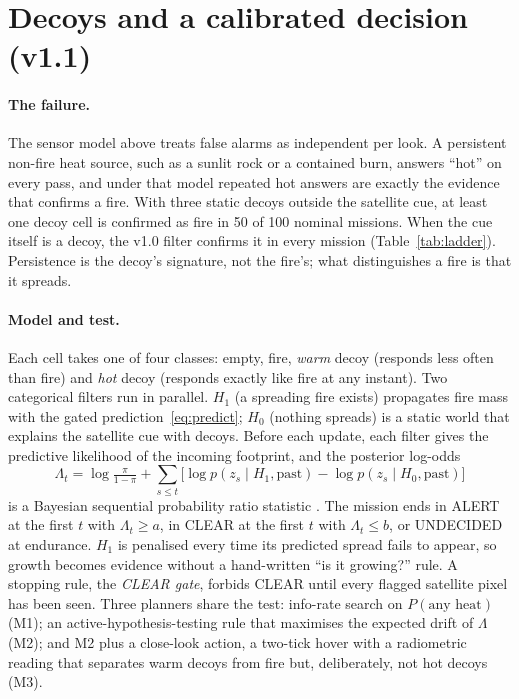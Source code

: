 \documentclass[10pt,a4paper]{article}
\begin{document}
\section{Decoys and a calibrated decision (v1.1)}\label{sec:v11}
\paragraph{The failure.} The sensor model above treats false alarms as independent per look. A persistent non-fire heat source, such as a sunlit rock or a contained burn, answers ``hot'' on every pass, and under that model repeated hot answers are exactly the evidence that confirms a fire. With three static decoys outside the satellite cue, at least one decoy cell is confirmed as fire in 50 of 100 nominal missions. When the cue itself is a decoy, the v1.0 filter confirms it in every mission (Table~\ref{tab:ladder}). Persistence is the decoy's signature, not the fire's; what distinguishes a fire is that it spreads.

\paragraph{Model and test.} Each cell takes one of four classes: empty, fire, \emph{warm} decoy (responds less often than fire) and \emph{hot} decoy (responds exactly like fire at any instant). Two categorical filters run in parallel. $H_1$ (a spreading fire exists) propagates fire mass with the gated prediction~\eqref{eq:predict}; $H_0$ (nothing spreads) is a static world that explains the satellite cue with decoys. Before each update, each filter gives the predictive likelihood of the incoming footprint, and the posterior log-odds
\[
\Lambda_t=\log\tfrac{\pi}{1-\pi}+\textstyle\sum_{s\le t}\big[\log p(z_s\mid H_1,\text{past})-\log p(z_s\mid H_0,\text{past})\big]
\]
is a Bayesian sequential probability ratio statistic \citep{wald1945}. The mission ends in ALERT at the first $t$ with $\Lambda_t\ge a$, in CLEAR at the first $t$ with $\Lambda_t\le b$, or UNDECIDED at endurance. $H_1$ is penalised every time its predicted spread fails to appear, so growth becomes evidence without a hand-written ``is it growing?'' rule. A stopping rule, the \emph{CLEAR gate}, forbids CLEAR until every flagged satellite pixel has been seen. Three planners share the test: info-rate search on $P(\text{any heat})$ (M1); an active-hypothesis-testing rule that maximises the expected drift of $\Lambda$ \citep{chernoff1959, naghshvar2013} (M2); and M2 plus a close-look action, a two-tick hover with a radiometric reading that separates warm decoys from fire but, deliberately, not hot decoys (M3).
\end{document}
